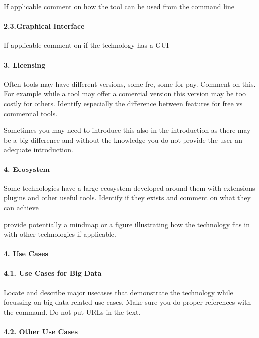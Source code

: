 \documentclass[9pt,twocolumn,twoside]{../../styles/osajnl}
\begin{document}
If applicable comment on how the tool can be used from the command line

\paragraph{2.3.Graphical Interface}

If applicable comment on if the technology has a GUI

\paragraph{3. Licensing}

Often tools may have different versions, some fre, some for
pay. Comment on this. For example while a tool may offer a comercial
version this version may be too costly for others. Identify especially
the difference between features for free vs commercial tools.

Sometimes you may need to introduce this also in the introduction as
there may be a big difference and without the knowledge you do not
provide the user an adequate introduction.

\paragraph{4. Ecosystem}

Some technologies have a large ecosystem developed around them with
extensions plugins and other useful tools. Identify if they exists and
comment on what they can achieve

provide potentially a mindmap or a figure illustrating how the
technology fits in with other technologies if applicable.

\paragraph{4. Use Cases}

\paragraph{4.1. Use Cases  for Big Data}

Locate and describe major usecases that demonstrate the technology
while focussing on big data related use cases. Make sure you do proper
references with the \cite{?} command. Do not put URLs in the text.

\paragraph {4.2. Other Use Cases}
\end{document}
